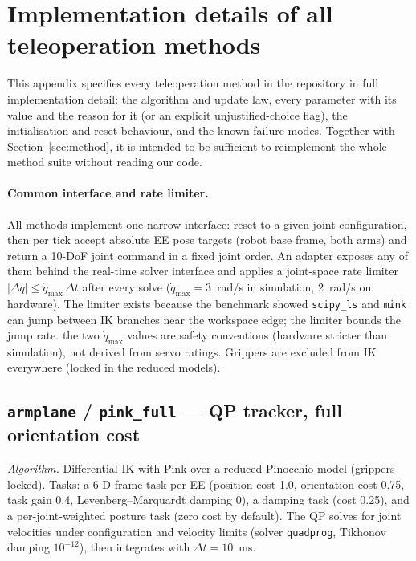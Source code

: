 \section{Implementation details of all teleoperation methods}
\label{app:methods}

This appendix specifies every teleoperation method in the repository in
full implementation detail: the algorithm and update law, every
parameter with its value and the reason for it (or an explicit
unjustified-choice flag), the initialisation and reset behaviour, and
the known failure modes. Together with Section~\ref{sec:method}, it is
intended to be sufficient to reimplement the whole method suite without
reading our code.

\paragraph{Common interface and rate limiter.}
All methods implement one narrow interface: reset to a given joint
configuration, then per tick accept absolute EE pose targets (robot base
frame, both arms) and return a 10-DoF joint command in a fixed joint
order. An adapter exposes any of them behind the real-time solver
interface and applies a joint-space rate limiter
\(\lvert\Delta q\rvert \le \dot q_{\max}\,\Delta t\) after every solve
(\(\dot q_{\max}=3\)~rad/s in simulation, 2~rad/s on hardware). The
limiter exists because the benchmark showed \texttt{scipy\_ls} and
\texttt{mink} can jump between IK branches near the workspace edge; the
limiter bounds the jump rate. \unjustified{} the two
\(\dot q_{\max}\) values are safety conventions (hardware stricter than
simulation), not derived from servo ratings. Grippers are excluded from
IK everywhere (locked in the reduced models).

\subsection{\texttt{armplane} / \texttt{pink\_full} — QP tracker, full orientation cost}
\label{app:pink-full}

\emph{Algorithm.} Differential IK with Pink over a reduced Pinocchio
model (grippers locked). Tasks: a 6-D frame task per EE (position cost
1.0, orientation cost 0.75, task gain 0.4, Levenberg--Marquardt damping
0), a damping task (cost 0.25), and a per-joint-weighted posture task
(zero cost by default). The QP solves for joint velocities under
configuration and velocity limits (solver \texttt{quadprog}, Tikhonov
damping \(10^{-12}\)), then integrates with \(\Delta t = 10\)~ms.

